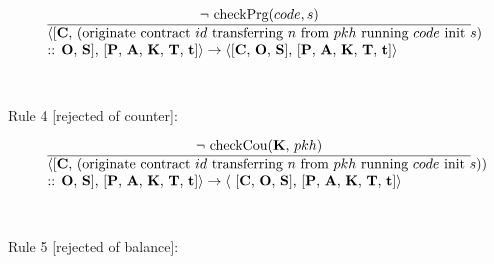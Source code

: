 \documentclass[a4paper]{llncs}
\begin{document}
\begin{equation}{}
\frac{\text{$\neg$ checkPrg($code, s$)}}{\parbox{4.2in}{\text{$\langle$[\ACCOUNTS, (originate contract ${id}$ transferring  ${n}$ from ${pkh}$ running ${code}$ init ${s}$)} \text{:: \OPERATIONS, \CONTRACTS], [\PENDING, \ACCEPTED, \MANAGERS, \CONTRACTORS, \TIME]$\rangle \rightarrow \langle$[\ACCOUNTS, \OPERATIONS, \CONTRACTS],} \text{[\PENDING, \ACCEPTED, \MANAGERS, \CONTRACTORS, \TIME]$\rangle$}}} 
\end{equation}
~\\
~\\
Rule 4 [rejected of counter]:

\begin{equation}{}
\frac{\text{$\neg$ checkCou(\MANAGERS, $pkh$)}}{\parbox{4.2in}{\text{$\langle$[\ACCOUNTS, (originate contract ${id}$ transferring  ${n}$ from ${pkh}$ running ${code}$ init ${s}$))} \text{:: \OPERATIONS, \CONTRACTS], [\PENDING, \ACCEPTED, \MANAGERS, \CONTRACTORS, \TIME]$\rangle \rightarrow \langle$ [\ACCOUNTS, \OPERATIONS, \CONTRACTS],} \text{[\PENDING, \ACCEPTED, \MANAGERS, \CONTRACTORS, \TIME]$\rangle$}}} 
\end{equation}
~\\
~\\
Rule 5 [rejected of balance]:
\end{document}
